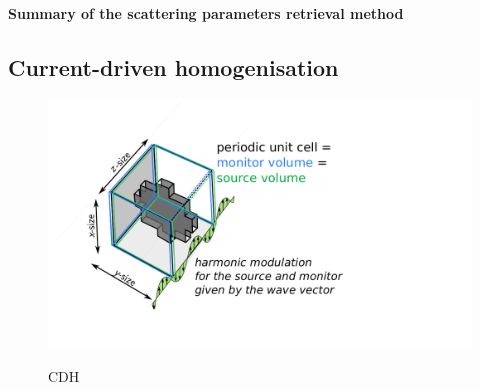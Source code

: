 
\paragraph{Summary of the scattering parameters retrieval method} %



\subsection{Current-driven homogenisation} %
\begin{figure}[ht] \centering \caption{CDH } \includegraphics[width=12cm]{img/cdh_geometry.pdf}  \label{fg_fdtd_cdh} \end{figure} %

